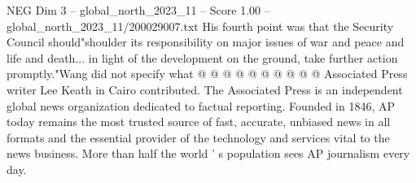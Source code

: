 \begin{textsample}{NEG Dim 3 – global\_north\_2023\_11 – Score 1.00 – global\_north\_2023\_11/200029007.txt}
His fourth point was that the Security Council should"shoulder its responsibility on major issues of war and peace and life and death... in light of the development on the ground, take further action promptly."Wang did not specify what @ @ @ @ @ @ @ @ @ @ Associated Press writer Lee Keath in Cairo contributed.
The Associated Press is an independent global news organization dedicated to factual reporting.
Founded in 1846, AP today remains the most trusted source of fast, accurate, unbiased news in all formats and the essential provider of the technology and services vital to the news business.
More than half the world ' s population sees AP journalism every day.

\end{textsample}
